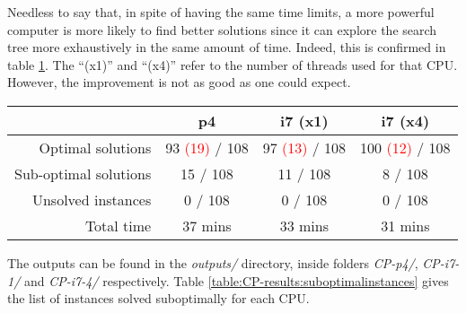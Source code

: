 \hfill

Needless to say that, in spite of having the same time limits, a more powerful computer
is more likely to find better solutions since it can explore the search tree more exhaustively
in the same amount of time. Indeed, this is confirmed in table \ref{table:CP-results}.
The ``(x1)'' and ``(x4)'' refer to the number of threads used for that CPU. However,
the improvement is not as good as one could expect.

\begin{table}[H]
\centering
	\begin{tabular}{rccc}
								& p4			& i7 (x1)	& i7 (x4) \\
		\midrule
		Optimal solutions		& 93 \textcolor{red}{(19)} / 108
											& 97 \textcolor{red}{(13)} / 108
														& 100 \textcolor{red}{(12)} / 108 \\
		Sub-optimal solutions	& 15 / 108	& 11 / 108	&   8 / 108 \\
		Unsolved instances		&  0 / 108	&  0 / 108	&   0 / 108 \\
		Total time				& 37 mins	& 33 mins	& 31 mins \\
	\end{tabular}
	\label{table:CP-results}
\end{table}

The outputs can be found in the \textit{outputs/} directory, inside folders
\textit{CP-p4/}, \textit{CP-i7-1/} and \textit{CP-i7-4/} respectively.
Table \ref{table:CP-results:suboptimalinstances} gives the list of instances
solved suboptimally for each CPU.

